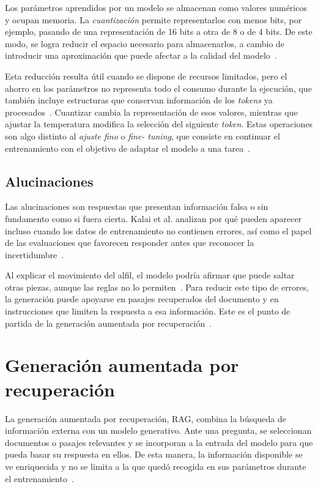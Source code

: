 Los parámetros aprendidos por un modelo se almacenan como valores numéricos y
ocupan memoria. La \textit{cuantización} permite representarlos con menos bits,
por ejemplo, pasando de una representación de 16 bits a otra de 8 o de 4 bits.
De este modo, se logra reducir el espacio necesario para almacenarlos, a cambio
de introducir una aproximación que puede afectar a la calidad del
modelo~\cite{hf_cuantizacion}.

Esta reducción resulta útil cuando se dispone de recursos limitados, pero el
ahorro en los parámetros no representa todo el consumo durante la ejecución,
que también incluye estructuras que conservan información de los \textit{tokens} ya
procesados~\cite{hf_cache}. Cuantizar cambia la representación de esos valores,
mientras que ajustar la temperatura modifica la selección del siguiente \textit{token}.
Estas operaciones son algo distinto al \textit{ajuste fino} o \textit{fine-
tuning}, que consiste en continuar el entrenamiento con el objetivo de adaptar
el modelo a una tarea~\cite{hf_ajuste_fino}.

\subsection{Alucinaciones}

Las alucinaciones son respuestas que presentan información falsa o sin
fundamento como si fuera cierta. Kalai et al. analizan por qué pueden aparecer
incluso cuando los datos de entrenamiento no contienen errores, así como el
papel de las evaluaciones que favorecen responder antes que reconocer la
incertidumbre~\cite{kalai2025hallucinate}.

Al explicar el movimiento del alfil, el modelo podría afirmar que puede
saltar otras piezas, aunque las reglas no lo
permiten~\cite{fide2023ajedrez}. Para reducir este tipo de errores, la generación puede apoyarse en pasajes recuperados del
documento y en instrucciones que limiten la respuesta a esa información. Este
es el punto de partida de la generación aumentada por
recuperación~\cite{lewis2020rag}.

\section{Generación aumentada por recuperación}

La generación aumentada por recuperación, \acs{RAG}, combina la búsqueda de
información externa con un modelo generativo. Ante una pregunta, se seleccionan
documentos o pasajes relevantes y se incorporan a la entrada del modelo para
que pueda basar su respuesta en ellos. De esta manera, la información
disponible se ve enriquecida y no se limita a la que quedó recogida en sus
parámetros durante el entrenamiento~\cite{lewis2020rag}.

